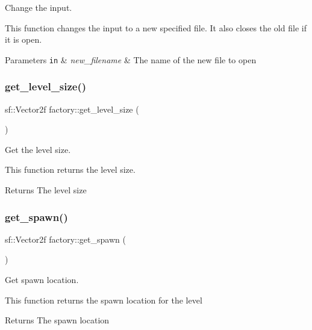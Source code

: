 Change the input. 

This function changes the input to a new specified file. It also closes the old file if it is open. 
\begin{DoxyParams}[1]{Parameters}
\mbox{\tt in}  & {\em new\+\_\+filename} & The name of the new file to open \\
\hline
\end{DoxyParams}
\mbox{\label{classfactory_af9bb026273b34fc032ca5ac73d457611}} 
\subsubsection{\texorpdfstring{get\+\_\+level\+\_\+size()}{get\_level\_size()}}
{\footnotesize\ttfamily sf\+::\+Vector2f factory\+::get\+\_\+level\+\_\+size (\begin{DoxyParamCaption}{ }\end{DoxyParamCaption})}



Get the level size. 

This function returns the level size.

\begin{DoxyReturn}{Returns}
The level size 
\end{DoxyReturn}
\mbox{\label{classfactory_a3c3a039b8f76a947267dbe659166550b}} 
\subsubsection{\texorpdfstring{get\+\_\+spawn()}{get\_spawn()}}
{\footnotesize\ttfamily sf\+::\+Vector2f factory\+::get\+\_\+spawn (\begin{DoxyParamCaption}{ }\end{DoxyParamCaption})}



Get spawn location. 

This function returns the spawn location for the level

\begin{DoxyReturn}{Returns}
The spawn location 
\end{DoxyReturn}
\mbox{\label{classfactory_afb2fad4ac9b0f39b1bfc3f3fc8d218b6}} 
